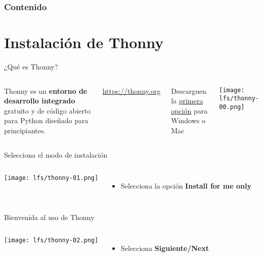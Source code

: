 \begin{frame}
    \frametitle{Contenido}
    \tableofcontents
\end{frame}

\section{Instalación de Thonny}

\begin{frame}[c]{¿Qué es Thonny?}
    \begin{columns}
        Thonny es un \textbf{entorno de desarrollo integrado} gratuito y
        de código abierto para Python diseñado para principiantes.
        \vspace{\baselineskip}

        \href{https://thonny.org}{https://thonny.org}

        \vspace{\baselineskip}
        Descarguen la \underline{primera opción} para Windows o Mac

        \begin{center}
            \texttt{[image: lfs/thonny-00.png]}
        \end{center}
    \end{columns}
\end{frame}

\begin{frame}[c]{Selecciona el modo de instalación}
    \begin{columns}
        \begin{center}
            \texttt{[image: lfs/thonny-01.png]}
        \end{center}
        \begin{itemize}
          \item Selecciona la opción \textbf{Install for me only}
        \end{itemize}
    \end{columns}
\end{frame}

\begin{frame}[c]{Bienvenida al uso de Thonny}
    \begin{columns}
        \begin{center}
            \texttt{[image: lfs/thonny-02.png]}
        \end{center}
        \begin{itemize}
          \item Selecciona \textbf{Siguiente/Next}
        \end{itemize}
    \end{columns}
\end{frame}

